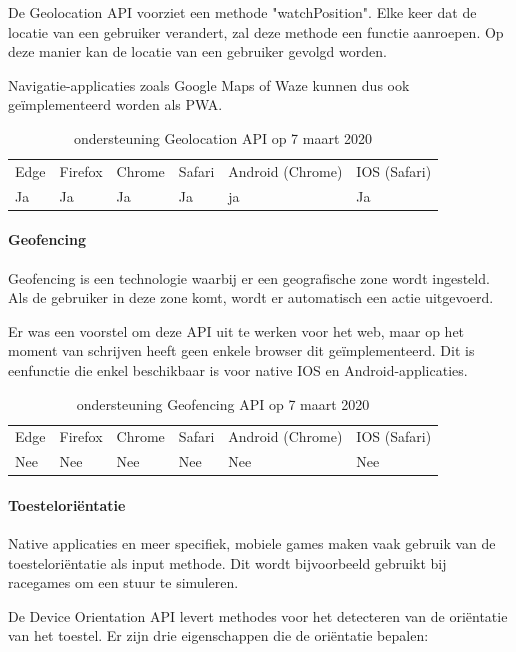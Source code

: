 De Geolocation API voorziet een methode "watchPosition". Elke keer dat de locatie van een gebruiker verandert, zal deze methode een functie aanroepen. Op deze manier kan de locatie van een gebruiker gevolgd worden.

Navigatie-applicaties zoals Google Maps of Waze kunnen dus ook geïmplementeerd worden als PWA.

\begin{table}[H]
	\centering
	\begin{tabular}{llllll}
		Edge & Firefox & Chrome & Safari & Android (Chrome) & IOS (Safari) \\
		Ja   & Ja      &  Ja     & Ja     & ja               & Ja          
	\end{tabular}	
	\caption{ondersteuning Geolocation API op 7 maart 2020}
\end{table}


\paragraph{Geofencing}
Geofencing is een technologie waarbij er een geografische zone wordt ingesteld. Als de gebruiker in deze zone komt, wordt er automatisch een actie uitgevoerd. 

Er was een voorstel om deze API \autocite{Kruisselbrink2017} uit te werken voor het web, maar op het moment van schrijven heeft geen enkele browser dit geïmplementeerd. Dit is eenfunctie die enkel beschikbaar is voor native IOS en Android-applicaties.

\begin{table}[H]
	\centering
	\begin{tabular}{llllll}
		Edge & Firefox & Chrome & Safari & Android (Chrome) & IOS (Safari) \\
		Nee   & Nee      &  Nee     & Nee     & Nee               & Nee          
	\end{tabular}	
	\caption{ondersteuning Geofencing API op 7 maart 2020}
\end{table}

\paragraph{Toesteloriëntatie }

Native applicaties en meer specifiek, mobiele games maken vaak gebruik van de toesteloriëntatie als input methode. Dit wordt bijvoorbeeld gebruikt bij racegames om een stuur te simuleren.

De Device Orientation API \autocite{Tibbett2019} levert methodes voor het detecteren van de oriëntatie van het toestel. Er zijn drie eigenschappen die de oriëntatie bepalen:


